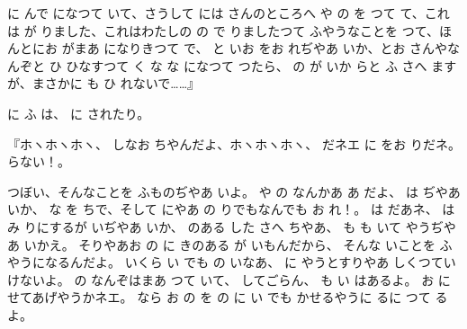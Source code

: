 に
んで
になつて
いて、さうして
には
さんのところへ
や
の
を
つて
て、これは
が
りました、これはわたしの
の
で
りましたつて
ふやうなことを
つて、ほんとにお
がまあ
になりきつて
で、
と
いお
をお
れぢやあ
いか、とお
さんやなんぞと
ひ
ひなすつて
く
な
な
になつて
つたら、
の
が
いか
らと
ふ
さへ
ますが、まさかに
も
ひ
れないで……』

に
ふ
は、
に
されたり。

『ホヽホヽホヽ、
しなお
ちやんだよ、ホヽホヽホヽ、
だネエ
に
をお
りだネ。
らない！。

つぼい、そんなことを
ふものぢやあ
いよ。
や
の
なんかあ
あ
だよ、
は
ぢやあ
いか、
な
を
ちで、そして
にやあ
の
りでもなんでも
お
れ！。
は
だあネ、
は
み
りにするが
いぢやあ
いか、
のある
した
さへ
ちやあ、
も
も
いて
やうぢやあ
いかえ。
そりやあお
の
に
きのある
が
いもんだから、
そんな
いことを
ふやうになるんだよ。
いくら
い
でも
の
いなあ、
に
やうとすりやあ
しくつていけないよ。
の
なんぞはまあ
つて
いて、
してごらん、
も
い
はあるよ。
お
に
せてあげやうかネエ。
なら
お
の
を
の
に
い
でも
かせるやうに
るに
つて
るよ。

